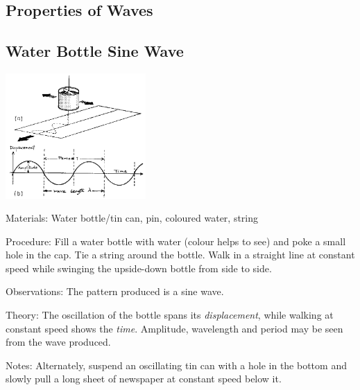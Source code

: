 \begin{multicols}{2}
\columnbreak


\section*{Properties of Waves} 


\subsection{Water Bottle Sine Wave}

\begin{center}
\includegraphics[width=0.4\textwidth]{./img/source/sine-wave.png}
\end{center}

\begin{description*}
\item[Materials:]{Water bottle/tin can, pin, coloured water, string}
\item[Procedure:]{Fill a water bottle with water (colour helps to see) and poke a small hole in the cap. Tie a string around the bottle. Walk in a straight line at constant speed while swinging the upside-down bottle from side to side.}
\item[Observations:]{The pattern produced is a sine wave.}
\item[Theory:]{The oscillation of the bottle spans its \emph{displacement}, while walking at constant speed shows the \emph{time}. Amplitude, wavelength and period may be seen from the wave produced.}
\item[Notes:]{Alternately, suspend an oscillating tin can with a hole in the bottom and slowly pull a long sheet of newspaper at constant speed below it.}
\end{description*}


\end{multicols}
